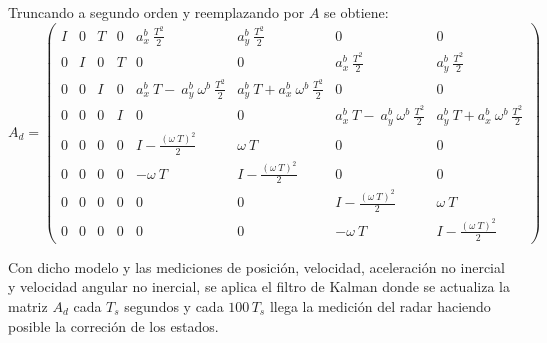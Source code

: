 	Truncando a segundo orden y reemplazando por $A$ se obtiene:
		\begin{equation*}
			A_d = \begin{pmatrix}	I&0&T&0&a^b_x\:\frac{T^2}{2}&a^b_y\:\frac{T^2}{2}&0&0\\[0.3em]%
						0&I&0&T&0&0&a^b_x\:\frac{T^2}{2}&a^b_y\:\frac{T^2}{2}\\[0.3em]%
						0&0&I&0&a^b_x\:T-\:a^b_y\:\omega^b\:\frac{T^2}{2}&a^b_y\: T+a^b_x\:\omega^b\:\frac{T^2}{2}&0&0\\[0.3em]%
						0&0&0&I&0&0&a^b_x\:T-\:a^b_y\:\omega^b\:\frac{T^2}{2}&a^b_y\: T+a^b_x\:\omega^b\:\frac{T^2}{2}\\[0.3em]%
						0&0&0&0&I-\frac{(\omega\:T)^2}{2}&\omega\:T&0&0\\[0.3em]%
						0&0&0&0&-\omega\:T&I-\frac{(\omega\:T)^2}{2}&0&0\\[0.3em]%
						0&0&0&0&0&0&I-\frac{(\omega\:T)^2}{2}&\omega\:T\\[0.3em]%
						0&0&0&0&0&0&-\omega\:T&I-\frac{(\omega\:T)^2}{2}
		\end{pmatrix}
		\end{equation*}


		Con dicho modelo y las mediciones de posición, velocidad, aceleración no inercial y velocidad angular no inercial, se aplica el filtro de Kalman 
		donde se actualiza la matriz $A_d$ cada $T_s$ segundos y cada $100\, T_s$ llega la medición del radar haciendo posible la correción de los estados.
	
%
%	
